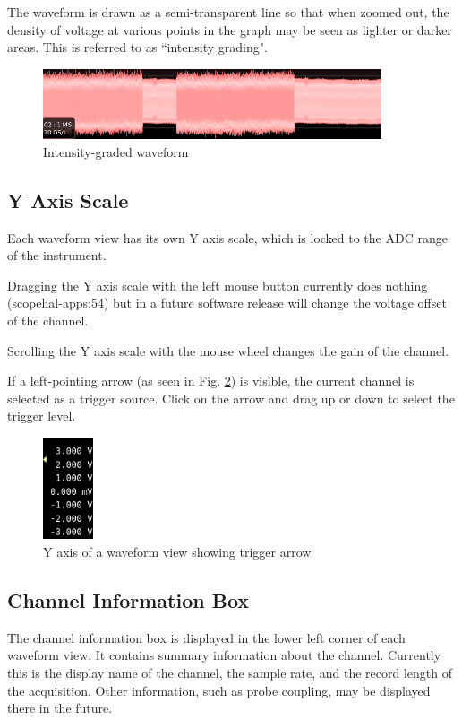 The waveform is drawn as a semi-transparent line so that when zoomed out, the density of voltage at various points in
the graph may be seen as lighter or darker areas. This is referred to as ``intensity grading".

\begin{figure}[H]
\centering
\includegraphics[width=10cm]{images/graded-waveform.png}
\caption{Intensity-graded waveform}
\label{graded-waveform2}
\end{figure}

\subsection{Y Axis Scale}

Each waveform view has its own Y axis scale, which is locked to the ADC range of the instrument.

Dragging the Y axis scale with the left mouse button currently does nothing (scopehal-apps:54) but in a future software
release will change the voltage offset of the channel.

Scrolling the Y axis scale with the mouse wheel changes the gain of the channel.

If a left-pointing arrow (as seen in Fig. \ref{y-axis}) is visible, the current channel is selected as a trigger
source. Click on the arrow and drag up or down to select the trigger level.

\begin{figure}[H]
\centering
\includegraphics[height=3cm]{images/y-axis.png}
\caption{Y axis of a waveform view showing trigger arrow}
\label{y-axis}
\end{figure}

\subsection{Channel Information Box}

The channel information box is displayed in the lower left corner of each waveform view. It contains summary
information about the channel. Currently this is the display name of the channel, the sample rate, and the record
length of the acquisition. Other information, such as probe coupling, may be displayed there in the future.

